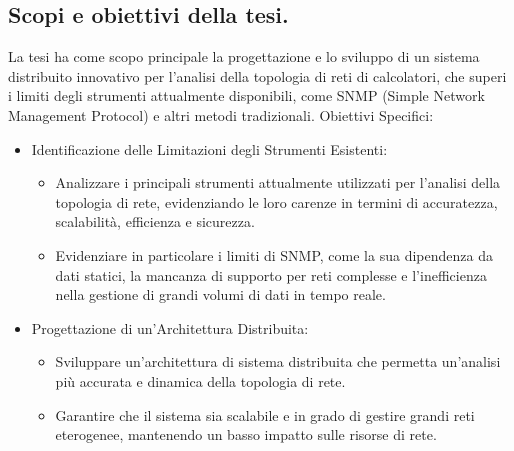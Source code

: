 \documentclass[target=bach,aauheader=,style=]{thud}
\begin{document}
\subsection{Scopi e obiettivi della tesi.}
La tesi ha come scopo principale la progettazione e lo sviluppo di un sistema distribuito innovativo per l'analisi della topologia di reti di calcolatori, che superi i limiti degli strumenti attualmente disponibili, come SNMP (Simple Network Management Protocol) e altri metodi tradizionali.
\newline
Obiettivi Specifici:
\begin{itemize}
  \item Identificazione delle Limitazioni degli Strumenti Esistenti:
    \begin{itemize}
      \item Analizzare i principali strumenti attualmente utilizzati per l'analisi della topologia di rete, evidenziando le loro carenze in termini di accuratezza, scalabilità, efficienza e sicurezza.
    \item Evidenziare in particolare i limiti di SNMP, come la sua dipendenza da dati statici, la mancanza di supporto per reti complesse e l'inefficienza nella gestione di grandi volumi di dati in tempo reale.
    \end{itemize}

  \item Progettazione di un'Architettura Distribuita:
    \begin{itemize}
      \item Sviluppare un'architettura di sistema distribuita che permetta un'analisi più accurata e dinamica della topologia di rete.
      \item Garantire che il sistema sia scalabile e in grado di gestire grandi reti eterogenee, mantenendo un basso impatto sulle risorse di rete.
    \end{itemize}
    


\end{itemize}
\end{document}

